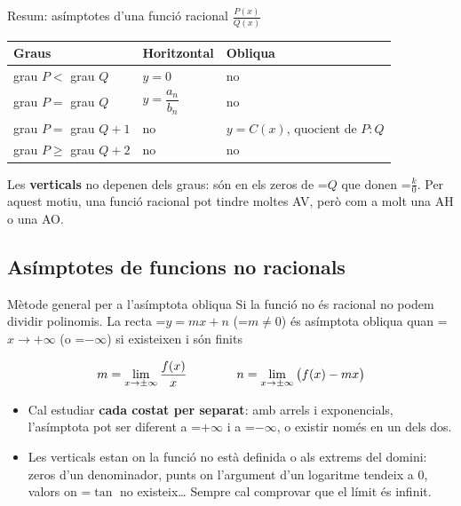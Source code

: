 \documentclass[11pt,a4paper]{article}
\newcommand{\lt}{<}\newcommand{\gt}{>}
\newcommand{\fmm}[1]{\setbox0=\hbox{$#1$}\ifdim\wd0>\linewidth\fmdisp{#1}\else\mbox{\box0}\fi}
\newcommand{\fmdisp}[1]{\[\setbox2=\hbox{$\displaystyle #1$}\ifdim\wd2>\linewidth\resizebox{\linewidth}{!}{\box2}\else\box2\fi\]}
\begin{document}
\begin{fmprop}{Resum: asímptotes d'una funció racional $\frac{P(x)}{Q(x)}$}
\begin{center}\renewcommand{\arraystretch}{1.5}\small\begin{tabularx}{\linewidth}{>{\raggedright\arraybackslash}p{5.2cm}>{\raggedright\arraybackslash}X>{\raggedright\arraybackslash}X}\toprule
\textbf{Graus} & \textbf{Horitzontal} & \textbf{Obliqua}\\\midrule
grau $P\lt$ grau $Q$ & $y=0$ & no\\[3pt]
grau $P=$ grau $Q$ & $y=\dfrac{a_n}{b_n}$ & no\\[3pt]
grau $P=$ grau $Q+1$ & no & $y=C(x)$, quocient de $P:Q$\\[3pt]
grau $P\geq$ grau $Q+2$ & no & no\\[3pt]
\bottomrule\end{tabularx}\end{center}

\begin{fmnote}Les \textbf{verticals} no depenen dels graus: són en els zeros de \fmm{Q} que donen \fmm{\frac k0}. Per aquest motiu, una funció racional pot tindre moltes AV, però com a molt una AH o una AO.\end{fmnote}
\end{fmprop}

\subsection*{Asímptotes de funcions no racionals}

\begin{fmdef}{Mètode general per a l'asímptota obliqua}
Si la funció no és racional no podem dividir polinomis. La recta \fmm{y=mx+n} (\fmm{m\neq0}) és asímptota obliqua quan \fmm{x\to+\infty} (o \fmm{-\infty}) si existeixen i són finits

\fmdisp{m=\lim_{x\to\pm\infty}\frac{f(x)}{x}\qquad\qquad n=\lim_{x\to\pm\infty}\big(f(x)-mx\big)}

\begin{itemize}
\item Cal estudiar \textbf{cada costat per separat}: amb arrels i exponencials, l'asímptota pot ser diferent a \fmm{+\infty} i a \fmm{-\infty}, o existir només en un dels dos.
\item Les verticals estan on la funció no està definida o als extrems del domini: zeros d'un denominador, punts on l'argument d'un logaritme tendeix a 0, valors on \fmm{\tan} no existeix\dots{} Sempre cal comprovar que el límit és infinit.
\end{itemize}
\end{fmdef}
\end{document}
